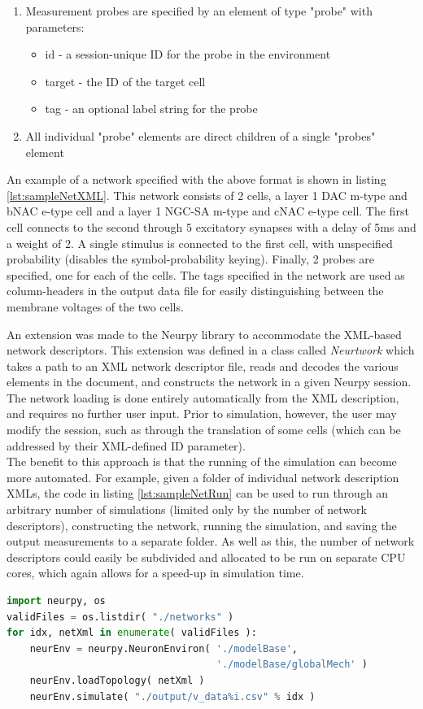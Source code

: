 \begin{enumerate}
    \item Measurement probes are specified by an element of type "probe" with parameters:
    \begin{itemize}
        \item id - a session-unique ID for the probe in the environment
        \item target - the ID of the target cell
        \item tag - an optional label string for the probe
    \end{itemize}
    \item All individual "probe" elements are direct children of a single "probes" element
\end{enumerate}

An example of a network specified with the above format is shown in listing \ref{lst:sampleNetXML}. This network consists of 2 cells, a layer 1 DAC m-type and bNAC e-type cell and a layer 1 NGC-SA m-type and cNAC e-type cell. The first cell connects to the second through 5 excitatory synapses with a delay of 5ms and a weight of 2. A single stimulus is connected to the first cell, with unspecified probability (disables the symbol-probability keying). Finally, 2 probes are specified, one for each of the cells. The tags specified in the network are used as column-headers in the output data file for easily distinguishing between the membrane voltages of the two cells.


An extension was made to the Neurpy library to accommodate the XML-based network descriptors. This extension was defined in a class called \emph{Neurtwork} which takes a path to an XML network descriptor file, reads and decodes the various elements in the document, and constructs the network in a given Neurpy session. The network loading is done entirely automatically from the XML description, and requires no further user input. Prior to simulation, however, the user may modify the session, such as through the translation of some cells (which can be addressed by their XML-defined ID parameter).\\
The benefit to this approach is that the running of the simulation can become more automated. For example, given a folder of individual network description XMLs, the code in listing \ref{lst:sampleNetRun} can be used to run through an arbitrary number of simulations (limited only by the number of network descriptors), constructing the network, running the simulation, and saving the output measurements to a separate folder. As well as this, the number of network descriptors could easily be subdivided and allocated to be run on separate CPU cores, which again allows for a speed-up in simulation time.
\begin{lstlisting}[language=Python,label=lst:sampleNetRun]
import neurpy, os
validFiles = os.listdir( "./networks" )
for idx, netXml in enumerate( validFiles ):
    neurEnv = neurpy.NeuronEnviron( './modelBase',
                                    './modelBase/globalMech' )
    neurEnv.loadTopology( netXml )
    neurEnv.simulate( "./output/v_data%i.csv" % idx )
\end{lstlisting}


